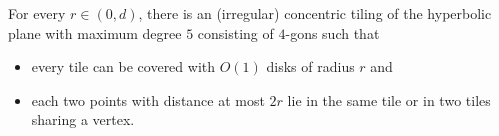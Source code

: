 %
%
\begin{lemma}\label{lem:tiling_small_radius}
    For every $ r \in (0, d) $, there is an (irregular) concentric tiling of the hyperbolic plane with maximum degree $ 5 $ consisting of $ 4 $-gons such that
    \begin{itemize}
        \item every tile can be covered with $ O(1) $ disks of radius $ r $ and
        \item each two points with distance at most $ 2r $ lie in the same tile or in two tiles sharing a vertex.
    \end{itemize}
%
\end{lemma}
%
